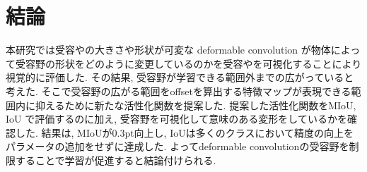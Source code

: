 \chapter{結論}\label{sec_conc}
本研究では受容やの大きさや形状が可変な deformable convolution が物体によって受容野の形状をどのように変更しているのかを受容やを可視化することにより視覚的に評価した. その結果, 受容野が学習できる範囲外までの広がっていると考えた. そこで受容野の広がる範囲をoffsetを算出する特徴マップが表現できる範囲内に抑えるために新たな活性化関数を提案した. 提案した活性化関数をMIoU, IoU で評価するのに加え, 受容野を可視化して意味のある変形をしているかを確認した. 結果は, MIoUが0.3pt向上し, IoUは多くのクラスにおいて精度の向上をパラメータの追加をせずに達成した. よってdeformable convolutionの受容野を制限することで学習が促進すると結論付けられる.
